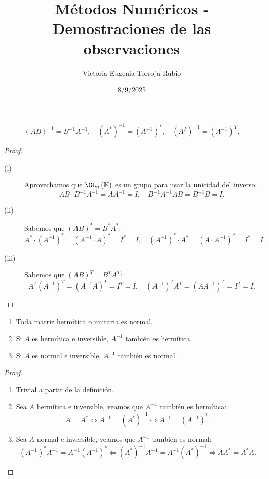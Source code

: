 \documentclass{article}
\begin{document}
\title{Métodos Numéricos - Demostraciones de las observaciones}
\author{Victoria Eugenia Torroja Rubio}
\date{8/9/2025}

\maketitle
\begin{observation}
	\[\left(AB\right)^{-1} = B^{-1}A^{-1}, \quad \left(A^{*}\right)^{-1} = \left(A^{-1}\right)^{*}, \quad \left(A^{T}\right)^{-1} = \left(A^{-1}\right)^{T} .\]	
\end{observation}
\begin{proof}
\begin{description}
\item[(i)] Aprovechamos que $\displaystyle \GL_{n}\left(\K\right) $ es un grupo para usar la unicidad del inverso:
	\[AB \cdot B^{-1}A^{-1} = A A ^{-1} = I, \quad B^{-1}A^{-1}AB = B^{-1}B = I .\]
\item[(ii)] Sabemos que $\displaystyle \left(AB\right)^{*} = B^{*}A^{*} $:
	\[ A^{*} \cdot \left(A^{-1}\right)^{*} = \left(A^{-1} \cdot A\right)^{*} = I^{*} = I, \quad \left(A^{-1}\right)^{*} \cdot A^{*} = \left(A \cdot A^{-1}\right)^{*} = I^{*} = I .\]
\item[(iii)] Sabemos que $\displaystyle \left(AB\right)^{T} = B^{T}A^{T} $:
	\[A^{T}\left(A^{-1}\right)^{T} = \left(A^{-1} A\right)^{T}= I^{T} = I, \quad \left(A^{-1}\right)^{T}A^{T} = \left(A A^{-1}\right)^{T}= I^{T} = I .\]
\end{description}
\end{proof}
\begin{observation}
\begin{enumerate}
\item Toda matriz hermítica o unitaria es normal. 
\item Si $\displaystyle A $ es hermítica e inversible, $\displaystyle A^{-1} $ también es hermítica.
\item Si $\displaystyle A $ es normal e inversible, $\displaystyle A^{-1} $ también es normal. 
\end{enumerate}
\end{observation}
\begin{proof}
\begin{enumerate}
\item Trivial a partir de la definición.
\item Sea $\displaystyle A $ hermítica e inversible, veamos que $\displaystyle A^{-1} $ también es hermítica:
	\[A = A^{*} \iff A^{-1} = \left(A^{*}\right)^{-1} \iff A^{-1} = \left(A^{-1}\right)^{*} .\]
\item Sea $\displaystyle A $ normal e inversible, veamos que $\displaystyle A^{-1} $ también es normal:
	\[\left(A^{-1}\right)^{*}A^{-1} = A^{-1}\left(A^{-1}\right)^{*} \iff \left(A^{*}\right)^{-1}A^{-1} = A^{-1}\left(A^{*}\right)^{-1} \iff A A^{*} = A^{*}A .\]
\end{enumerate}
\end{proof}
\end{document}
